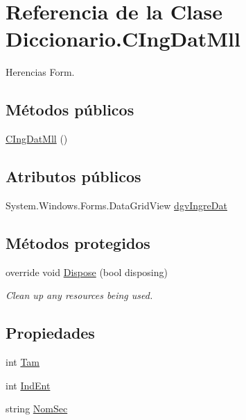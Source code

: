 \hypertarget{class_diccionario_1_1_c_ing_dat_mll}{\section{Referencia de la Clase Diccionario.\-C\-Ing\-Dat\-Mll}
\label{class_diccionario_1_1_c_ing_dat_mll}
}


Herencias Form.

\subsection*{Métodos públicos}
\begin{DoxyCompactItemize}
\item 
\hyperlink{class_diccionario_1_1_c_ing_dat_mll_a758a96c1ce68c5c2daac84dc86c672e9}{C\-Ing\-Dat\-Mll} ()
\end{DoxyCompactItemize}
\subsection*{Atributos públicos}
\begin{DoxyCompactItemize}
\item 
System.\-Windows.\-Forms.\-Data\-Grid\-View \hyperlink{class_diccionario_1_1_c_ing_dat_mll_a3cc1be099bb4784f4eed882f93d2a9cd}{dgv\-Ingre\-Dat}
\end{DoxyCompactItemize}
\subsection*{Métodos protegidos}
\begin{DoxyCompactItemize}
\item 
override void \hyperlink{class_diccionario_1_1_c_ing_dat_mll_ace17b551a3936c9f22ca2dbd2a5320dd}{Dispose} (bool disposing)
\begin{DoxyCompactList}\small\item\em Clean up any resources being used. \end{DoxyCompactList}\end{DoxyCompactItemize}
\subsection*{Propiedades}
\begin{DoxyCompactItemize}
\item 
int \hyperlink{class_diccionario_1_1_c_ing_dat_mll_a872c8df788279d9da07cdce5b4f77b4e}{Tam}
\item 
int \hyperlink{class_diccionario_1_1_c_ing_dat_mll_a3606f18b69846e242aa89b31b6182b7d}{Ind\-Ent}
\item 
string \hyperlink{class_diccionario_1_1_c_ing_dat_mll_a32743a22e355f7605920f32741cb76cf}{Nom\-Sec}
\end{DoxyCompactItemize}



